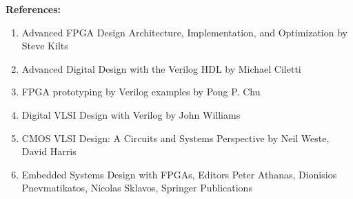 \noindent \textbf{References:}
  \begin{enumerate}[label=\arabic*.]
    \item Advanced FPGA Design Architecture, Implementation, and Optimization by Steve Kilts
    \item Advanced Digital Design with the Verilog HDL by Michael Ciletti
    \item FPGA prototyping by Verilog examples by Pong P. Chu
    \item Digital VLSI Design with Verilog by John Williams
    \item CMOS VLSI Design: A Circuits and Systems Perspective by Neil Weste, David Harris
    \item Embedded Systems Design with FPGAs, Editors Peter Athanas, Dionisios Pnevmatikatos, Nicolas Sklavos, Springer Publications
  \end{enumerate}

\newpage

